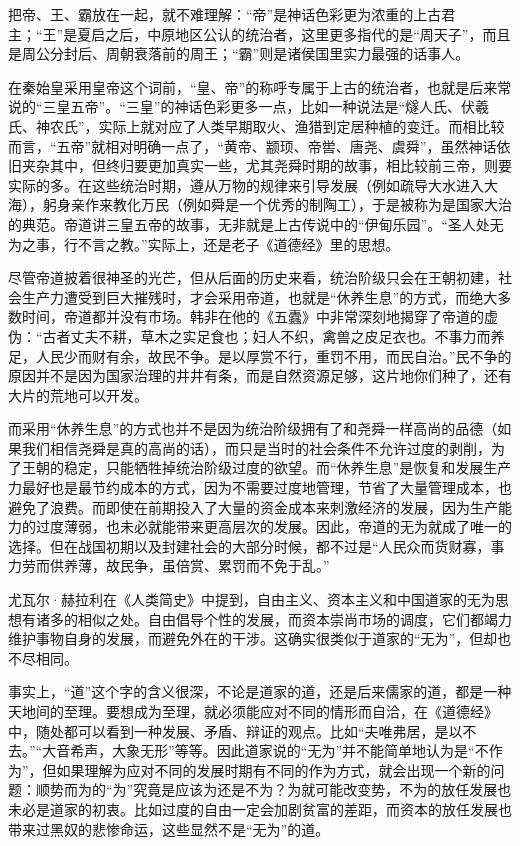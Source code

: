 \documentclass[
]{book}
\begin{document}
把帝、王、霸放在一起，就不难理解：``帝''是神话色彩更为浓重的上古君主；``王''是夏启之后，中原地区公认的统治者，这里更多指代的是``周天子''，而且是周公分封后、周朝衰落前的周王；``霸''则是诸侯国里实力最强的话事人。

在秦始皇采用皇帝这个词前，``皇、帝''的称呼专属于上古的统治者，也就是后来常说的``三皇五帝''。``三皇''的神话色彩更多一点，比如一种说法是``燧人氏、伏羲氏、神农氏''，实际上就对应了人类早期取火、渔猎到定居种植的变迁。而相比较而言，``五帝''就相对明确一点了，``黄帝、颛顼、帝喾、唐尧、虞舜''，虽然神话依旧夹杂其中，但终归要更加真实一些，尤其尧舜时期的故事，相比较前三帝，则要实际的多。在这些统治时期，遵从万物的规律来引导发展（例如疏导大水进入大海），躬身亲作来教化万民（例如舜是一个优秀的制陶工），于是被称为是国家大治的典范。帝道讲三皇五帝的故事，无非就是上古传说中的``伊甸乐园''。``圣人处无为之事，行不言之教。''实际上，还是老子《道德经》里的思想。

尽管帝道披着很神圣的光芒，但从后面的历史来看，统治阶级只会在王朝初建，社会生产力遭受到巨大摧残时，才会采用帝道，也就是``休养生息''的方式，而绝大多数时间，帝道都并没有市场。韩非在他的《五蠹》中非常深刻地揭穿了帝道的虚伪：``古者丈夫不耕，草木之实足食也；妇人不织，禽兽之皮足衣也。不事力而养足，人民少而财有余，故民不争。是以厚赏不行，重罚不用，而民自治。''民不争的原因并不是因为国家治理的井井有条，而是自然资源足够，这片地你们种了，还有大片的荒地可以开发。

而采用``休养生息''的方式也并不是因为统治阶级拥有了和尧舜一样高尚的品德（如果我们相信尧舜是真的高尚的话），而只是当时的社会条件不允许过度的剥削，为了王朝的稳定，只能牺牲掉统治阶级过度的欲望。而``休养生息''是恢复和发展生产力最好也是最节约成本的方式，因为不需要过度地管理，节省了大量管理成本，也避免了浪费。而即使在前期投入了大量的资金成本来刺激经济的发展，因为生产能力的过度薄弱，也未必就能带来更高层次的发展。因此，帝道的无为就成了唯一的选择。但在战国初期以及封建社会的大部分时候，都不过是``人民众而货财寡，事力劳而供养薄，故民争，虽倍赏、累罚而不免于乱。''

尤瓦尔·赫拉利在《人类简史》中提到，自由主义、资本主义和中国道家的无为思想有诸多的相似之处。自由倡导个性的发展，而资本崇尚市场的调度，它们都竭力维护事物自身的发展，而避免外在的干涉。这确实很类似于道家的``无为''，但却也不尽相同。

事实上，``道''这个字的含义很深，不论是道家的道，还是后来儒家的道，都是一种天地间的至理。要想成为至理，就必须能应对不同的情形而自洽，在《道德经》中，随处都可以看到一种发展、矛盾、辩证的观点。比如``夫唯弗居，是以不去。''``大音希声，大象无形''等等。因此道家说的``无为''并不能简单地认为是``不作为''，但如果理解为应对不同的发展时期有不同的作为方式，就会出现一个新的问题：顺势而为的``为''究竟是应该为还是不为？为就可能改变势，不为的放任发展也未必是道家的初衷。比如过度的自由一定会加剧贫富的差距，而资本的放任发展也带来过黑奴的悲惨命运，这些显然不是``无为''的道。
\end{document}
